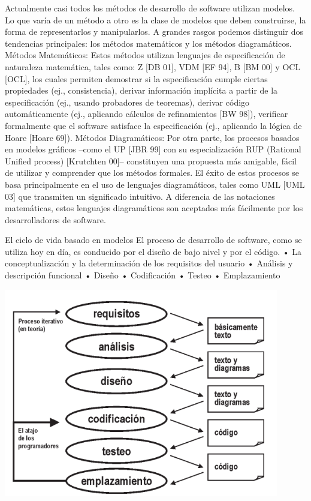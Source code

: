 \begin{flushleft}
\begin{itemize}
Actualmente casi todos los métodos de desarrollo de software utilizan modelos. Lo que varía de un método a otro es la clase de modelos que deben construirse, la forma de representarlos y manipularlos. A grandes rasgos podemos distinguir dos tendencias principales: los métodos matemáticos y los métodos diagramáticos.
Métodos Matemáticos:
Estos métodos utilizan lenguajes de especificación de naturaleza matemática, tales como: Z [DB 01], VDM [EF 94], B [BM 00] y OCL [OCL], los cuales permiten demostrar si la especificación cumple ciertas propiedades (ej., consistencia), derivar información implícita a partir de la especificación (ej., usando probadores de teoremas), derivar código automáticamente (ej., aplicando cálculos de refinamientos [BW 98]), verificar formalmente que el software satisface la especificación (ej., aplicando la lógica de Hoare [Hoare 69]).
Métodos Diagramáticos:
Por otra parte, los procesos basados en modelos gráficos –como el UP [JBR 99] con su especialización RUP (Rational Unified process) [Krutchten 00]– constituyen una propuesta más amigable, fácil de utilizar y comprender que los métodos formales. El éxito de estos procesos se basa principalmente en el uso de lenguajes diagramáticos, tales como UML [UML 03] que transmiten un significado intuitivo. A diferencia de las notaciones matemáticas, estos lenguajes diagramáticos son aceptados más fácilmente por los desarrolladores de software.

El ciclo de vida basado en modelos
El proceso de desarrollo de software, como se utiliza hoy en día, es conducido por el diseño de bajo nivel y por el código.
•	La conceptualización y la determinación de los requisitos del usuario 
•	Análisis y descripción funcional 
•	Diseño 
•	Codificación
•	Testeo 
•	Emplazamiento

\begin{center}
    \includegraphics[width=12cm]{./Imagenes/mdd2}
    \end{center}


\end{itemize}
\end{flushleft}
